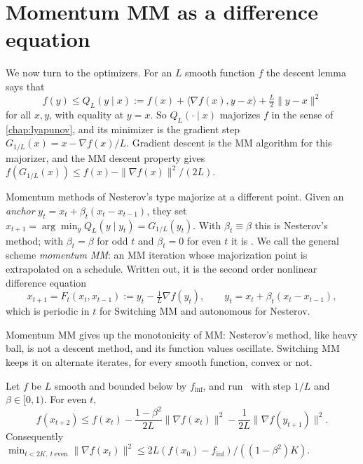 \section{Momentum MM as a difference equation}\label{sec:ch5b:mm}

We now turn to the optimizers. For an $L$ smooth function $f$ the descent lemma
says that
\begin{equation}\label{eq:ch5b:major}
  f(y)\le Q_L(y\mid x):=f(x)+\langle\nabla f(x),y-x\rangle+\tfrac L2\|y-x\|^2
\end{equation}
for all $x,y$, with equality at $y=x$. So $Q_L(\cdot\mid x)$ majorizes $f$ in the
sense of \cref{chap:lyapunov}, and its minimizer is the gradient step
$G_{1/L}(x)=x-\nabla f(x)/L$. Gradient descent is the MM algorithm for this
majorizer, and the MM descent property gives
$f(G_{1/L}(x))\le f(x)-\|\nabla f(x)\|^2/(2L)$.

Momentum methods of Nesterov's type majorize at a different point. Given an \emph{anchor}
$y_t=x_t+\beta_t(x_t-x_{t-1})$, they set $x_{t+1}=\arg\min_yQ_L(y\mid y_t)
=G_{1/L}(y_t)$. With $\beta_t\equiv\beta$ this is Nesterov's method; with
$\beta_t=\beta$ for odd $t$ and $\beta_t=0$ for even $t$ it is \smmdet. We call
the general scheme \emph{momentum MM}: an MM iteration whose majorization point
is extrapolated on a schedule. Written out, it is the second order nonlinear
difference equation
\begin{equation}\label{eq:ch5b:momentummm}
  x_{t+1}=F_t(x_t,x_{t-1}):=y_t-\tfrac1L\nabla f(y_t),\qquad
  y_t=x_t+\beta_t(x_t-x_{t-1}),
\end{equation}
which is periodic in $t$ for Switching MM and autonomous for Nesterov.

Momentum MM gives up the monotonicity of MM: Nesterov's method, like heavy ball,
is not a descent method, and its function values oscillate. Switching MM
keeps it on alternate iterates, for every smooth function, convex or not.

\begin{proposition}\label{prop:ch5b:monotone}
Let $f$ be $L$ smooth and bounded below by $f_{\inf}$, and run \smmdet\ with
step $1/L$ and $\beta\in[0,1)$. For even $t$,
\[
  f(x_{t+2})\le f(x_t)-\frac{1-\beta^2}{2L}\|\nabla f(x_t)\|^2
  -\frac1{2L}\|\nabla f(y_{t+1})\|^2 .
\]
Consequently $\min_{t<2K,\ t\ \mathrm{even}}\|\nabla f(x_t)\|^2\le
2L(f(x_0)-f_{\inf})/((1-\beta^2)K)$.
\end{proposition}

